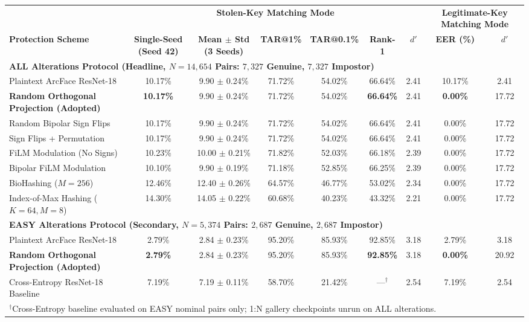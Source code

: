 \begin{tabular}{lcccccccc}
\toprule
& \multicolumn{6}{c}{\textbf{Stolen-Key Matching Mode}} & \multicolumn{2}{c}{\textbf{Legitimate-Key Matching Mode}} \\
\cmidrule(lr){2-7} \cmidrule(lr){8-9}
\textbf{Protection Scheme} & \textbf{Single-Seed (Seed 42)} & \textbf{Mean $\pm$ Std (3 Seeds)} & \textbf{TAR@1\%} & \textbf{TAR@0.1\%} & \textbf{Rank-1} & \textbf{$d'$} & \textbf{EER (\%)} & \textbf{$d'$} \\
\midrule
\multicolumn{9}{l}{\textbf{ALL Alterations Protocol (Headline, $N=14{,}654$ Pairs: $7{,}327$ Genuine, $7{,}327$ Impostor)}} \\
\midrule
Plaintext ArcFace ResNet-18 & 10.17\% & 9.90 $\pm$ 0.24\% & 71.72\% & 54.02\% & 66.64\% & 2.41 & 10.17\% & 2.41 \\
\textbf{Random Orthogonal Projection (Adopted)} & \textbf{10.17\%} & 9.90 $\pm$ 0.24\% & 71.72\% & 54.02\% & \textbf{66.64\%} & 2.41 & \textbf{0.00\%} & 17.72 \\
Random Bipolar Sign Flips & 10.17\% & 9.90 $\pm$ 0.24\% & 71.72\% & 54.02\% & 66.64\% & 2.41 & 0.00\% & 17.72 \\
Sign Flips + Permutation & 10.17\% & 9.90 $\pm$ 0.24\% & 71.72\% & 54.02\% & 66.64\% & 2.41 & 0.00\% & 17.72 \\
FiLM Modulation (No Signs) & 10.23\% & 10.00 $\pm$ 0.21\% & 71.82\% & 52.03\% & 66.18\% & 2.39 & 0.00\% & 17.72 \\
Bipolar FiLM Modulation & 10.10\% & 9.90 $\pm$ 0.19\% & 71.18\% & 52.85\% & 66.25\% & 2.39 & 0.00\% & 17.72 \\
BioHashing ($M=256$) & 12.46\% & 12.40 $\pm$ 0.26\% & 64.57\% & 46.77\% & 53.02\% & 2.34 & 0.00\% & 17.72 \\
Index-of-Max Hashing ($K=64, M=8$) & 14.30\% & 14.05 $\pm$ 0.22\% & 60.68\% & 40.23\% & 43.32\% & 2.21 & 0.00\% & 17.72 \\
\midrule
\multicolumn{9}{l}{\textbf{EASY Alterations Protocol (Secondary, $N=5{,}374$ Pairs: $2{,}687$ Genuine, $2{,}687$ Impostor)}} \\
\midrule
Plaintext ArcFace ResNet-18 & 2.79\% & 2.84 $\pm$ 0.23\% & 95.20\% & 85.93\% & 92.85\% & 3.18 & 2.79\% & 3.18 \\
\textbf{Random Orthogonal Projection (Adopted)} & \textbf{2.79\%} & 2.84 $\pm$ 0.23\% & 95.20\% & 85.93\% & \textbf{92.85\%} & 3.18 & \textbf{0.00\%} & 20.92 \\
Cross-Entropy ResNet-18 Baseline & 7.19\% & 7.19 $\pm$ 0.11\% & 58.70\% & 21.42\% & ---$^\dagger$ & 2.54 & 7.19\% & 2.54 \\
\bottomrule
\multicolumn{9}{l}{\footnotesize $^\dagger$Cross-Entropy baseline evaluated on EASY nominal pairs only; 1:N gallery checkpoints unrun on ALL alterations.}
\end{tabular}